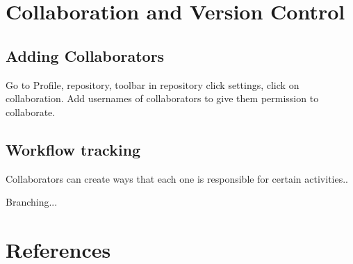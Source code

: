 \documentclass[12pt]{../SOP4_alpha}\usepackage[]{graphicx}\usepackage[]{xcolor}
\begin{document}


\section{Collaboration and Version Control}

\subsection{Adding Collaborators}
\NP Go to Profile, repository, toolbar in repository click settings, click on collaboration. Add usernames of collaborators to give them permission to collaborate.

\subsection{Workflow tracking}

\NP Collaborators can create ways that each one is responsible for certain activities..

\NP Branching...
 

\section{References}

\NP 
\end{document}

